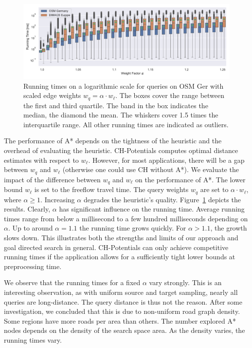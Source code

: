 \documentclass[manuscript,review]{acmart}
\begin{document}
\begin{figure}
\centering
\includegraphics[width=\linewidth]{fig/scaled_weights.pdf}
\caption{
Running times on a logarithmic scale for queries on OSM Ger with scaled edge weights $w_q = \alpha \cdot w_\ell$.
The boxes cover the range between the first and third quartile.
The band in the box indicates the median, the diamond the mean.
The whiskers cover 1.5 times the interquartile range.
All other running times are indicated as outliers.
}\label{fig:scaled_weights}
\end{figure}

The performance of A* depends on the tightness of the heuristic and the overhead of evaluating the heuristic.
CH-Potentials computes optimal distance estimates with respect to $w_\ell$.
However, for most applications, there will be a gap between $w_q$ and $w_\ell$ (otherwise one could use CH without A*).
We evaluate the impact of the difference between $w_q$ and $w_\ell$ on the performance of A*.
The lower bound $w_\ell$ is set to the freeflow travel time.
The query weights $w_q$ are set to $\alpha \cdot w_\ell$, where $\alpha\ge 1$.
Increasing $\alpha$ degrades the heuristic's quality.
Figure~\ref{fig:scaled_weights} depicts the results.
Clearly, $\alpha$ has significant influence on the running time.
Average running times range from below a millisecond to a few hundred milliseconds depending on $\alpha$.
Up to around $\alpha = 1.1$ the running time grows quickly.
For $\alpha > 1.1$, the growth slows down.
This illustrates both the strengths and limits of our approach and goal directed search in general.
CH-Potentials can only achieve competitive running times if the application allows for a sufficiently tight lower bounds at preprocessing time.

We observe that the running times for a fixed $\alpha$ vary strongly.
This is an interesting observation, as with uniform source and target sampling, nearly all queries are long-distance.
The query distance is thus not the reason.
After some investigation, we concluded that this is due to non-uniform road graph density.
Some regions have more roads per area than others.
The number explored A* nodes depends on the density of the search space area.
As the density varies, the running times vary.
\end{document}
